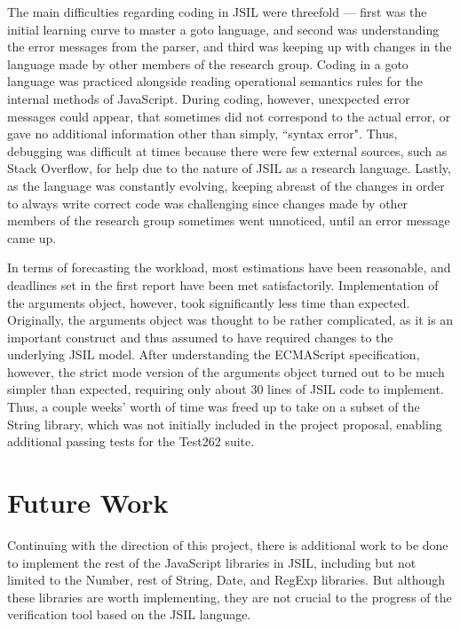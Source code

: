 \documentclass[a4paper,11pt,twoside]{report}
\begin{document}
The main difficulties regarding coding in JSIL were threefold --- first was the initial learning curve to master a goto language, and second was understanding the error messages from the parser, and third was keeping up with changes in the language made by other members of the research group. Coding in a goto language was practiced alongside reading operational semantics rules for the internal methods of JavaScript. During coding, however, unexpected error messages could appear, that sometimes did not correspond to the actual error, or gave no additional information other than simply, ``syntax error". Thus, debugging was difficult at times because there were few external sources, such as Stack Overflow, for help due to the nature of JSIL as a research language. Lastly, as the language was constantly evolving, keeping abreast of the changes in order to always write correct code was challenging since changes made by other members of the research group sometimes went unnoticed, until an error message came up. 

In terms of forecasting the workload, most estimations have been reasonable, and deadlines set in the first report have been met satisfactorily. Implementation of the arguments object, however, took significantly less time than expected. Originally, the arguments object was thought to be rather complicated, as it is an important construct and thus assumed to have required changes to the underlying JSIL model. After understanding the ECMAScript specification, however, the strict mode version of the arguments object turned out to be much simpler than expected, requiring only about 30 lines of JSIL code to implement. Thus, a couple weeks' worth of time was freed up to take on a subset of the String library, which was not initially included in the project proposal, enabling additional passing tests for the Test262 suite.

\section{Future Work}
Continuing with the direction of this project, there is additional work to be done to implement the rest of the JavaScript libraries in JSIL, including but not limited to the Number, rest of String, Date, and RegExp libraries. But although these libraries are worth implementing, they are not crucial to the progress of the verification tool based on the JSIL language.
\end{document}
